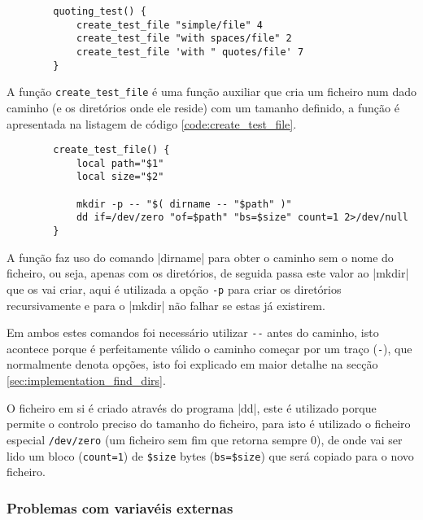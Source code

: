 \begin{listing}[H]
	\centering
	\begin{verbatim}
		quoting_test() {
			create_test_file "simple/file" 4
			create_test_file "with spaces/file" 2
			create_test_file 'with " quotes/file' 7
		}
	\end{verbatim}
	\cprotect\caption{Exemplo da definição de um teste do \Verb|spacecheck.sh|.}
	\label{code:test_definition}
\end{listing}

A função \Verb|create_test_file| é uma função auxiliar que cria um ficheiro num
dado caminho (e os diretórios onde ele reside) com um tamanho definido, a função
é apresentada na listagem de código \ref{code:create_test_file}.

\begin{listing}[H]
	\centering
	\begin{verbatim}
		create_test_file() {
			local path="$1"
			local size="$2"

			mkdir -p -- "$( dirname -- "$path" )"
			dd if=/dev/zero "of=$path" "bs=$size" count=1 2>/dev/null
		}
	\end{verbatim}
	\cprotect\caption{Definição da função \Verb|create_test_file|.}
	\label{code:create_test_file}
\end{listing}

A função faz uso do comando \bashinline|dirname| para obter o caminho sem o nome
do ficheiro, ou seja, apenas com os diretórios, de seguida passa este valor ao
\bashinline|mkdir| que os vai criar, aqui é utilizada a opção \Verb|-p| para
criar os diretórios recursivamente e para o \bashinline|mkdir| não falhar se
estas já existirem.

Em ambos estes comandos foi necessário utilizar \Verb|--| antes do caminho, isto
acontece porque é perfeitamente válido o caminho começar por um traço
(\Verb|-|), que normalmente denota opções, isto foi explicado em maior detalhe
na secção \ref{sec:implementation_find_dirs}.

O ficheiro em si é criado através do programa \bashinline|dd|, este é utilizado
porque permite o controlo preciso do tamanho do ficheiro, para isto é utilizado
o ficheiro especial \Verb|/dev/zero| (um ficheiro sem fim que retorna sempre 0),
de onde vai ser lido um bloco (\Verb|count=1|) de \Verb|$size| bytes
(\Verb|bs=$size|) que será copiado para o novo ficheiro.

\subsubsection{Problemas com variavéis externas}

